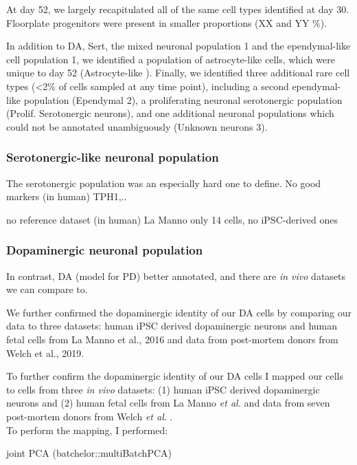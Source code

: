 At day 52, we largely recapitulated all of the same cell types identified at day 30.
Floorplate progenitors were present in smaller proportions (XX and YY \%).

In addition to DA, Sert, the mixed neuronal population 1 and the ependymal-like cell population 1, we identified a population of astrocyte-like cells, which were unique to day 52 (Astrocyte-like \cite{sloan2017human, zhang2016purification}). 
Finally, we identified three additional rare cell types (<2\% of cells sampled at any time point), including a second ependymal-like population (Ependymal 2), a proliferating neuronal serotonergic population (Prolif. Serotonergic neurons), and one additional neuronal populations which could not be annotated unambiguously (Unknown neurons 3).

\subsubsection{Serotonergic-like neuronal population}

The serotonergic population was an especially hard one to define.
No good markers (in human)
TPH1,..

no reference dataset (in human)
La Manno only 14 cells, no iPSC-derived ones

\subsubsection{Dopaminergic neuronal population}

In contrast, DA (model for PD) better annotated, and there are \textit{in vivo} datasets we can compare to.

We further confirmed the dopaminergic identity of our DA cells by comparing our data to three  datasets: human iPSC derived dopaminergic neurons and human fetal cells from La Manno et al., 2016 and data from post-mortem donors from Welch et al., 2019. 

To further confirm the dopaminergic identity of our DA cells I mapped our cells to cells from three \textit{in vivo} datasets:
(1) human iPSC derived dopaminergic neurons and (2) human fetal cells from La Manno \textit{et al.} \cite{la2016molecular} and data from seven post-mortem donors from Welch \textit{et al}. \cite{welch2019single}. \\

To perform the mapping, I performed:

joint PCA (batchelor::multiBatchPCA) 

